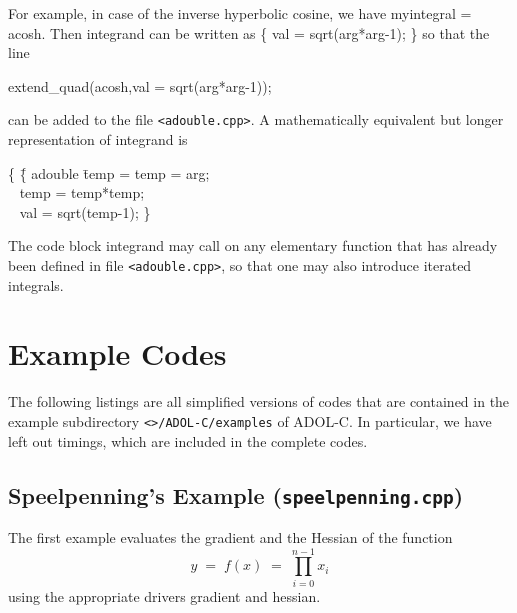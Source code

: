 \documentclass[11pt,twoside]{article}
\begin{document}
For example, in case of the inverse hyperbolic cosine, we have 
{\sf myintegral} = {\sf acosh}. Then {\sf integrand} can be written as 
{\sf \{ val = sqrt(arg*arg-1); \}} 
so that the line
\begin{center}
{\sf extend\_quad(acosh,val = sqrt(arg*arg-1));} 
\end{center}
can be added to the file \verb=<adouble.cpp>=.
A mathematically equivalent but longer representation of 
{\sf integrand} is
\begin{center}
\begin{tabbing}
{\sf \{ }\hspace{1.0in}\= {\sf  \{ adouble} \= temp =   \kill
  \> {\sf temp = arg;} \\
 \> \ \> {\sf  temp = temp*temp; } \\ 
 \> \ \> {\sf  val = sqrt(temp-1); \}}  
\end{tabbing}
\end{center} 
The code block {\sf integrand} may call on any elementary function that has already
been defined in file \verb=<adouble.cpp>=, so that one may also introduce
iterated integrals.
%
%
\section{Example Codes}
\label{example}
%
The following listings are all simplified versions of codes that
are contained in the example subdirectory 
\verb=<=\texttt{\packagetar}\verb=>/ADOL-C/examples= of ADOL-C. In particular,
we have left out timings, which are included in the complete codes.
%
\subsection{Speelpenning's Example ({\tt speelpenning.cpp})}
%
The first example evaluates the gradient and the Hessian of
the function
\[ 
y \; = \; f(x)\; =\; \prod_{i=0}^{n-1} x_i 
\] 
using the appropriate drivers {\sf gradient} and {\sf hessian}.
\end{document}
